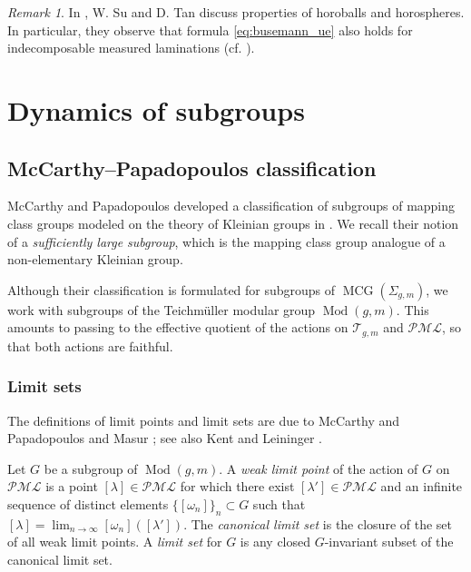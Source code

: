 \documentclass[dvipdfmx]{amsart}
\theoremstyle{remark}
\newtheorem{remark}{Remark}[section]
\newcommand{\teich}{\mathcal{T}}
\newcommand{\mcg}{\operatorname{MCG}}
\newcommand{\tmod}{\operatorname{Mod}}
\newcommand{\pml}{\mathcal{PML}}
\begin{document}
\begin{remark}
In \cite{SuTan2023}, W. Su and D. Tan discuss properties of horoballs and horospheres. In particular, they observe that formula \eqref{eq:busemann_ue} also holds for indecomposable measured laminations (cf. \cite[Proposition 5.7]{SuTan2023}).
\end{remark}



\section{Dynamics of subgroups}

\subsection{McCarthy--Papadopoulos classification}
McCarthy and Papadopoulos developed a classification of subgroups of mapping class groups modeled on the theory of Kleinian groups in \cite{McCarthyPapadopoulos1989}. We recall their notion of a \emph{sufficiently large subgroup}, which is the mapping class group analogue of a non-elementary Kleinian group.

Although their classification is formulated for subgroups of $\mcg(\Sigma_{g,m})$, we work with subgroups of the Teichm\"uller modular group $\tmod(g,m)$. This amounts to passing to the effective quotient of the actions on $\teich_{g,m}$ and $\pml$, so that both actions are faithful.

\subsubsection{Limit sets}

The definitions of limit points and limit sets are due to McCarthy and Papadopoulos \cite{McCarthyPapadopoulos1989} and Masur \cite{Masur1986}; see also Kent and Leininger \cite[\S3]{KentLeininger2008}.

Let $G$ be a subgroup of $\tmod(g,m)$. A \emph{weak limit point} of the action of $G$ on $\pml$ is a point $[\lambda]\in\pml$ for which there exist $[\lambda']\in\pml$ and an infinite sequence of distinct elements $\{[\omega_n]\}_n\subset G$ such that $[\lambda]=\lim_{n\to\infty}[\omega_n]([\lambda'])$. The \emph{canonical limit set} is the closure of the set of all weak limit points. A \emph{limit set} for $G$ is any closed $G$-invariant subset of the canonical limit set.
\end{document}
